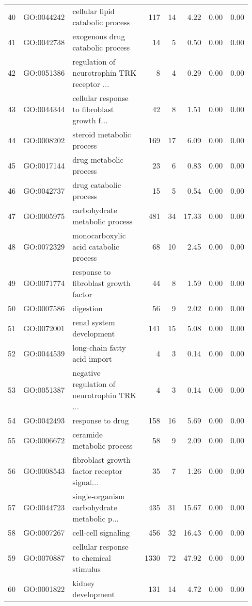 \begin{table}[ht]
\begin{tabular}{rllrrrrr}
  40 & GO:0044242 & cellular lipid catabolic process & 117 &  14 & 4.22 & 0.00 & 0.00 \\ 
  41 & GO:0042738 & exogenous drug catabolic process &  14 &   5 & 0.50 & 0.00 & 0.00 \\ 
  42 & GO:0051386 & regulation of neurotrophin TRK receptor ... &   8 &   4 & 0.29 & 0.00 & 0.00 \\ 
  43 & GO:0044344 & cellular response to fibroblast growth f... &  42 &   8 & 1.51 & 0.00 & 0.00 \\ 
  44 & GO:0008202 & steroid metabolic process & 169 &  17 & 6.09 & 0.00 & 0.00 \\ 
  45 & GO:0017144 & drug metabolic process &  23 &   6 & 0.83 & 0.00 & 0.00 \\ 
  46 & GO:0042737 & drug catabolic process &  15 &   5 & 0.54 & 0.00 & 0.00 \\ 
  47 & GO:0005975 & carbohydrate metabolic process & 481 &  34 & 17.33 & 0.00 & 0.00 \\ 
  48 & GO:0072329 & monocarboxylic acid catabolic process &  68 &  10 & 2.45 & 0.00 & 0.00 \\ 
  49 & GO:0071774 & response to fibroblast growth factor &  44 &   8 & 1.59 & 0.00 & 0.00 \\ 
  50 & GO:0007586 & digestion &  56 &   9 & 2.02 & 0.00 & 0.00 \\ 
  51 & GO:0072001 & renal system development & 141 &  15 & 5.08 & 0.00 & 0.00 \\ 
  52 & GO:0044539 & long-chain fatty acid import &   4 &   3 & 0.14 & 0.00 & 0.00 \\ 
  53 & GO:0051387 & negative regulation of neurotrophin TRK ... &   4 &   3 & 0.14 & 0.00 & 0.00 \\ 
  54 & GO:0042493 & response to drug & 158 &  16 & 5.69 & 0.00 & 0.00 \\ 
  55 & GO:0006672 & ceramide metabolic process &  58 &   9 & 2.09 & 0.00 & 0.00 \\ 
  56 & GO:0008543 & fibroblast growth factor receptor signal... &  35 &   7 & 1.26 & 0.00 & 0.00 \\ 
  57 & GO:0044723 & single-organism carbohydrate metabolic p... & 435 &  31 & 15.67 & 0.00 & 0.00 \\ 
  58 & GO:0007267 & cell-cell signaling & 456 &  32 & 16.43 & 0.00 & 0.00 \\ 
  59 & GO:0070887 & cellular response to chemical stimulus & 1330 &  72 & 47.92 & 0.00 & 0.00 \\ 
  60 & GO:0001822 & kidney development & 131 &  14 & 4.72 & 0.00 & 0.00 \\ 

\end{tabular}
\end{table}
